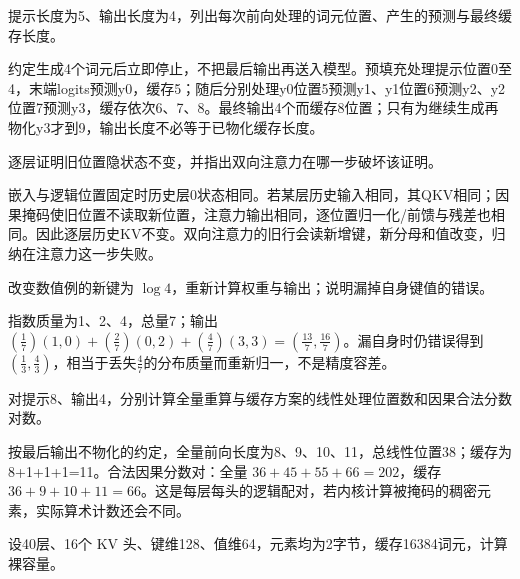 
\begin{exercises}
\begin{exercise} 提示长度为5、输出长度为4，列出每次前向处理的词元位置、产生的预测与最终缓存长度。

\begin{solution}
约定生成4个词元后立即停止，不把最后输出再送入模型。预填充处理提示位置0至4，末端logits预测y0，缓存5；随后分别处理y0位置5预测y1、y1位置6预测y2、y2位置7预测y3，缓存依次6、7、8。最终输出4个而缓存8位置；只有为继续生成再物化y3才到9，输出长度不必等于已物化缓存长度。
\end{solution}
\end{exercise}

\begin{exercise} 逐层证明旧位置隐状态不变，并指出双向注意力在哪一步破坏该证明。

\begin{solution}
嵌入与逻辑位置固定时历史层0状态相同。若某层历史输入相同，其QKV相同；因果掩码使旧位置不读取新位置，注意力输出相同，逐位置归一化/前馈与残差也相同。因此逐层历史KV不变。双向注意力的旧行会读新增键，新分母和值改变，归纳在注意力这一步失败。
\end{solution}
\end{exercise}

\begin{exercise} 改变数值例的新键为 $\log4$，重新计算权重与输出；说明漏掉自身键值的错误。

\begin{solution}
指数质量为1、2、4，总量7；输出 $(\frac{1}{7})(1,0)+(\frac{2}{7})(0,2)+(\frac{4}{7})(3,3)=(\frac{13}{7},\frac{16}{7})$。漏自身时仍错误得到 $(\frac{1}{3},\frac{4}{3})$，相当于丢失$\frac{4}{7}$的分布质量而重新归一，不是精度容差。
\end{solution}
\end{exercise}

\begin{exercise} 对提示8、输出4，分别计算全量重算与缓存方案的线性处理位置数和因果合法分数对数。

\begin{solution}
按最后输出不物化的约定，全量前向长度为8、9、10、11，总线性位置38；缓存为8+1+1+1=11。合法因果分数对：全量 $36+45+55+66=202$，缓存 $36+9+10+11=66$。这是每层每头的逻辑配对，若内核计算被掩码的稠密元素，实际算术计数还会不同。
\end{solution}
\end{exercise}

\begin{exercise} 设40层、16个 KV 头、键维128、值维64，元素均为2字节，缓存16384词元，计算裸容量。


\end{exercise}
\end{exercises}
